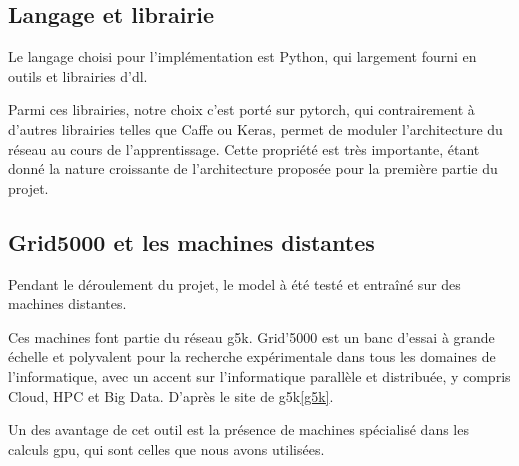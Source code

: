 \subsection{Langage et librairie}
Le langage choisi pour l'implémentation est Python, qui largement fourni en outils et librairies d'\gls{dl}.

Parmi ces librairies, notre choix c'est porté sur \gls{pytorch}, qui contrairement à d'autres librairies telles que Caffe ou Keras, permet de moduler l'architecture du réseau au cours de l'apprentissage. Cette propriété est très importante, étant donné la nature \og croissante\fg{} de l'architecture proposée pour la première partie du projet.

\subsection{Grid5000 et les machines distantes}
Pendant le déroulement du projet, le \gls{model} à été testé et entraîné sur des machines distantes.

Ces machines font partie du réseau \gls{g5k}.
\og Grid'5000 est un banc d'essai à grande échelle et polyvalent pour la recherche expérimentale dans tous les domaines de l'informatique, avec un accent sur l'informatique parallèle et distribuée, y compris Cloud, HPC et Big Data. \fg{} D'après le site de \gls{g5k}\autoref{g5k}.

Un des avantage de cet outil est la présence de machines spécialisé dans les calculs \gls{gpu}, qui sont celles que nous avons utilisées. %